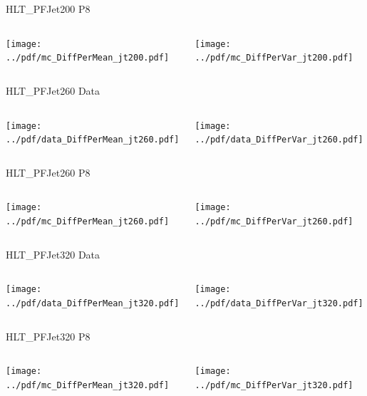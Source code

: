 \documentclass[9pt]{beamer}
\begin{document}
\begin{frame}[t]{HLT\_PFJet200 P8}
\begin{columns}[T]
  \begin{column}{.5\textwidth}
  \texttt{[image: ../pdf/mc\_DiffPerMean\_jt200.pdf]}
  \end{column}
  \begin{column}{.5\textwidth}
  \texttt{[image: ../pdf/mc\_DiffPerVar\_jt200.pdf]}
  \end{column}
\end{columns}
\end{frame}

\begin{frame}[t]{HLT\_PFJet260 Data}
\begin{columns}[T]
  \begin{column}{.5\textwidth}
  \texttt{[image: ../pdf/data\_DiffPerMean\_jt260.pdf]}
  \end{column}
  \begin{column}{.5\textwidth}
  \texttt{[image: ../pdf/data\_DiffPerVar\_jt260.pdf]}
  \end{column}
\end{columns}
\end{frame}

\begin{frame}[t]{HLT\_PFJet260 P8}
\begin{columns}[T]
  \begin{column}{.5\textwidth}
  \texttt{[image: ../pdf/mc\_DiffPerMean\_jt260.pdf]}
  \end{column}
  \begin{column}{.5\textwidth}
  \texttt{[image: ../pdf/mc\_DiffPerVar\_jt260.pdf]}
  \end{column}
\end{columns}
\end{frame}

\begin{frame}[t]{HLT\_PFJet320 Data}
\begin{columns}[T]
  \begin{column}{.5\textwidth}
  \texttt{[image: ../pdf/data\_DiffPerMean\_jt320.pdf]}
  \end{column}
  \begin{column}{.5\textwidth}
  \texttt{[image: ../pdf/data\_DiffPerVar\_jt320.pdf]}
  \end{column}
\end{columns}
\end{frame}

\begin{frame}[t]{HLT\_PFJet320 P8}
\begin{columns}[T]
  \begin{column}{.5\textwidth}
  \texttt{[image: ../pdf/mc\_DiffPerMean\_jt320.pdf]}
  \end{column}
  \begin{column}{.5\textwidth}
  \texttt{[image: ../pdf/mc\_DiffPerVar\_jt320.pdf]}
  \end{column}
\end{columns}
\end{frame}
\end{document}
